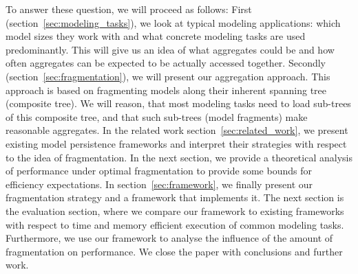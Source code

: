 To answer these question, we will proceed as follows: First (section~\ref{sec:modeling_tasks}), we look at typical modeling applications: which model sizes they work with and what concrete modeling tasks are used predominantly. This will give us an idea of what aggregates could be and how often aggregates can be expected to be actually accessed together. 
Secondly (section~\ref{sec:fragmentation}), we will present our aggregation approach. This approach is based on fragmenting models along their inherent spanning tree (composite tree). We will reason, that most modeling tasks need to load sub-trees of this composite tree, and that such sub-trees (model fragments) make reasonable aggregates. 
In the related work section~\ref{sec:related_work}, we present existing model persistence frameworks and interpret their strategies with respect to the idea of fragmentation.
In the next section, we provide a theoretical analysis of performance under optimal fragmentation to provide some bounds for efficiency expectations.
In section~\ref{sec:framework}, we finally present our fragmentation strategy and a framework that implements it.
The next section is the evaluation section, where we compare our framework to existing frameworks with respect to time and memory efficient execution of common modeling tasks. Furthermore, we use our framework to analyse the influence of the amount of fragmentation on performance.
We close the paper with conclusions and further work. 



